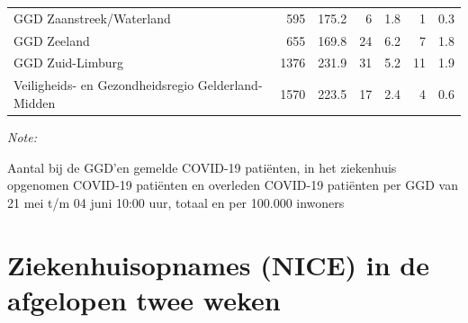 \documentclass[
  english,
  man,floatsintext]{apa6}
\begin{document}
\begin{table}
\begin{threeparttable}
\begin{tabular}{lrrrrrr}
GGD Zaanstreek/Waterland & 595 & 175.2 & 6 & 1.8 & 1 & 0.3\\
GGD Zeeland & 655 & 169.8 & 24 & 6.2 & 7 & 1.8\\
GGD Zuid-Limburg & 1376 & 231.9 & 31 & 5.2 & 11 & 1.9\\
Veiligheids- en Gezondheidsregio Gelderland-Midden & 1570 & 223.5 & 17 & 2.4 & 4 & 0.6\\
\bottomrule
\end{tabular}
\begin{tablenotes}
\item \textit{Note: } 
\item Aantal bij de GGD’en gemelde COVID-19 patiënten, in het ziekenhuis opgenomen COVID-19 patiënten en overleden COVID-19 patiënten per GGD van 21 mei t/m 04 juni 10:00 uur, totaal en per 100.000 inwoners
\end{tablenotes}
\end{threeparttable}
\endgroup{}
\end{table}

\newpage

\hypertarget{ziekenhuisopnames-nice-in-de-afgelopen-twee-weken}{%
\section{Ziekenhuisopnames (NICE) in de afgelopen twee weken}\label{ziekenhuisopnames-nice-in-de-afgelopen-twee-weken}}
\end{document}
